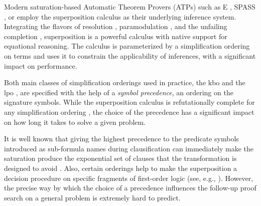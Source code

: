 




Modern saturation-based Automatic Theorem Provers (ATPs) such as E \cite{Schulz2019}, SPASS \cite{DBLP:conf/cade/WeidenbachDFKSW09},
or \Vampire{} \cite{DBLP:conf/cav/KovacsV13}
employ the superposition calculus \cite{DBLP:journals/logcom/BachmairG94,DBLP:books/el/RV01/NieuwenhuisR01} as their underlying inference system.
Integrating the flavors of resolution \cite{DBLP:books/el/RV01/BachmairG01}, paramodulation \cite{Robinson1983}, and 
the unfailing completion \cite{Bachmair89completionwithout},
superposition is a powerful calculus with
native support for equational reasoning.
The calculus is parameterized by a simplification ordering on terms %
and uses it to constrain the applicability of inferences, with a significant impact on performance.

Both main classes of simplification orderings used in practice,
the \acrlong*{kbo} \cite{Knuth1983}
and the \acrlong*{lpo} \cite{Kamin1980},
are specified with the help of a 
\emph{symbol precedence}, an ordering on the signature symbols. %
While the superposition calculus is refutationally complete for any simplification ordering \cite{DBLP:journals/logcom/BachmairG94},
the choice of the precedence has a significant impact on how long it takes to solve a given problem.

It is well known that giving the highest precedence to the predicate symbols introduced as sub-formula names 
during clausification \cite{DBLP:books/el/RV01/NonnengartW01}
can immediately make the saturation produce the exponential 
set of clauses that the transformation is designed to avoid \cite{Reger2016}.
Also, certain orderings help to make the superposition a decision procedure on specific fragments of first-order logic 
(see, e.g., \cite{DBLP:conf/lics/GanzingerN99,DBLP:conf/cade/HustadtKS05}).
However, the precise way by which the choice of a precedence 
influences the follow-up proof search on a general problem is extremely hard to predict. %

